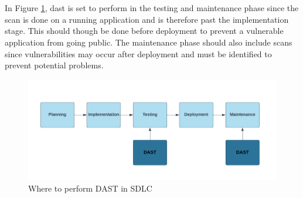 \\~\\
In Figure \ref{fig: Where to perform DAST in SDLC}, \acrshort{dast} is set to perform in the testing and maintenance phase since the scan is done on a running application and is therefore past the implementation stage. This should though be done before deployment to prevent a vulnerable application from going public. The maintenance phase should also include scans since vulnerabilities may occur after deployment and must be identified to prevent potential problems. 
\vspace{2mm}
\begin{figure}[H]
    \centering
    \includegraphics[width=0.8\columnwidth]{Images/dast.png}
    \caption{Where to perform DAST in SDLC} 
    \label{fig: Where to perform DAST in SDLC}
\end{figure}

